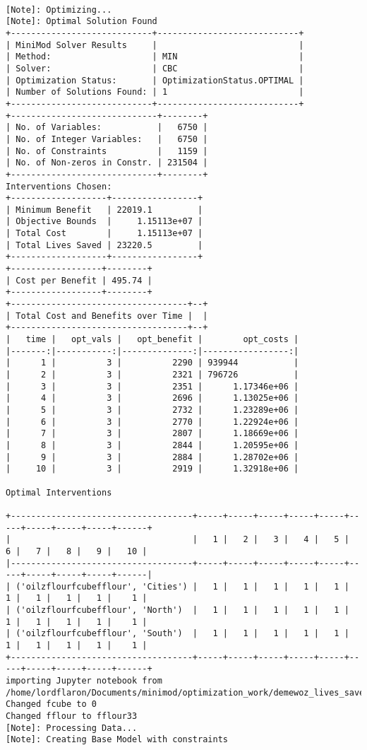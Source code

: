 \documentclass[
]{article}
\begin{document}
\begin{verbatim}
                
[Note]: Optimizing...
[Note]: Optimal Solution Found
+----------------------------+----------------------------+
| MiniMod Solver Results     |                            |
| Method:                    | MIN                        |
| Solver:                    | CBC                        |
| Optimization Status:       | OptimizationStatus.OPTIMAL |
| Number of Solutions Found: | 1                          |
+----------------------------+----------------------------+
+-----------------------------+--------+
| No. of Variables:           |   6750 |
| No. of Integer Variables:   |   6750 |
| No. of Constraints          |   1159 |
| No. of Non-zeros in Constr. | 231504 |
+-----------------------------+--------+
Interventions Chosen:
+-------------------+-----------------+
| Minimum Benefit   | 22019.1         |
| Objective Bounds  |     1.15113e+07 |
| Total Cost        |     1.15113e+07 |
| Total Lives Saved | 23220.5         |
+-------------------+-----------------+
+------------------+--------+
| Cost per Benefit | 495.74 |
+------------------+--------+
+-----------------------------------+--+
| Total Cost and Benefits over Time |  |
+-----------------------------------+--+
|   time |   opt_vals |   opt_benefit |        opt_costs |
|-------:|-----------:|--------------:|-----------------:|
|      1 |          3 |          2290 | 939944           |
|      2 |          3 |          2321 | 796726           |
|      3 |          3 |          2351 |      1.17346e+06 |
|      4 |          3 |          2696 |      1.13025e+06 |
|      5 |          3 |          2732 |      1.23289e+06 |
|      6 |          3 |          2770 |      1.22924e+06 |
|      7 |          3 |          2807 |      1.18669e+06 |
|      8 |          3 |          2844 |      1.20595e+06 |
|      9 |          3 |          2884 |      1.28702e+06 |
|     10 |          3 |          2919 |      1.32918e+06 |

Optimal Interventions

+------------------------------------+-----+-----+-----+-----+-----+-----+-----+-----+-----+------+
|                                    |   1 |   2 |   3 |   4 |   5 |   6 |   7 |   8 |   9 |   10 |
|------------------------------------+-----+-----+-----+-----+-----+-----+-----+-----+-----+------|
| ('oilzflourfcubefflour', 'Cities') |   1 |   1 |   1 |   1 |   1 |   1 |   1 |   1 |   1 |    1 |
| ('oilzflourfcubefflour', 'North')  |   1 |   1 |   1 |   1 |   1 |   1 |   1 |   1 |   1 |    1 |
| ('oilzflourfcubefflour', 'South')  |   1 |   1 |   1 |   1 |   1 |   1 |   1 |   1 |   1 |    1 |
+------------------------------------+-----+-----+-----+-----+-----+-----+-----+-----+-----+------+
importing Jupyter notebook from /home/lordflaron/Documents/minimod/optimization_work/demewoz_lives_saved/folate_effective_coverage_analysis.ipynb
Changed fcube to 0
Changed fflour to fflour33
[Note]: Processing Data...
[Note]: Creating Base Model with constraints


\end{verbatim}
\end{document}

